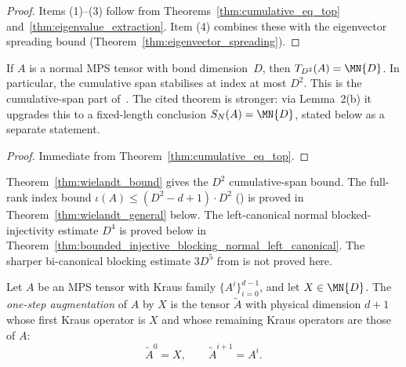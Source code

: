 \begin{proof}
    \leanok
    Items (1)--(3) follow from Theorems~\ref{thm:cumulative_eq_top}
    and~\ref{thm:eigenvalue_extraction}.
    Item (4) combines these with the eigenvector spreading bound
    (Theorem~\ref{thm:eigenvector_spreading}).
\end{proof}

\begin{theorem}\label{thm:wielandt_bound}
    \leanok
    If $A$ is a normal MPS tensor with bond dimension~$D$,
    then $T_{D^2}(A) = \MN{D}$.
    In particular, the cumulative span stabilises at index
    at most $D^2$.
    This is the cumulative-span part of~\cite[Theorem~1]{Sanz2010Quantum}.
    The cited theorem is stronger: via Lemma~2(b) it upgrades this to a
    fixed-length conclusion $S_N(A) = \MN{D}$, stated below as a
    separate statement.
\end{theorem}

\begin{proof}
    \leanok
    Immediate from Theorem~\ref{thm:cumulative_eq_top}.
\end{proof}

\begin{remark}\leanok
    Theorem~\ref{thm:wielandt_bound} gives the $D^2$
    cumulative-span bound.
    The full-rank index bound $\iota(A) \le (D^2 - d + 1) \cdot D^2$
    (\cite[Theorem~1, case~(1)]{Sanz2010Quantum}) is proved in
    Theorem~\ref{thm:wielandt_general} below.
    The left-canonical normal blocked-injectivity estimate $D^4$ is proved
    below in
    Theorem~\ref{thm:bounded_injective_blocking_normal_left_canonical}.
    The sharper bi-canonical blocking estimate $3D^5$ from
    \cite{Sanz2010Quantum} is not proved here.
\end{remark}

\begin{definition}\label{def:one_step_augment}
    \leanok
    Let $A$ be an MPS tensor with Kraus family $\{A^i\}_{i=0}^{d-1}$, and
    let $X \in \MN{D}$. The \emph{one-step augmentation} of $A$ by $X$
    is the tensor $\widetilde A$ with physical dimension $d+1$ whose
    first Kraus operator is $X$ and whose remaining Kraus operators are
    those of $A$:
    \[
        \widetilde A^0 = X, \qquad \widetilde A^{i+1}=A^i.
    \]
\end{definition}

